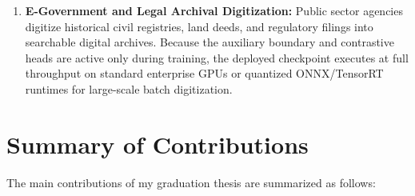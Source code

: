 \begin{enumerate}
    \item \textbf{E-Government and Legal Archival Digitization:}
    Public sector agencies digitize historical civil registries, land deeds, and regulatory filings into searchable digital archives. Because the auxiliary boundary and contrastive heads are active only during training, the deployed checkpoint executes at full throughput on standard enterprise GPUs or quantized ONNX/TensorRT runtimes for large-scale batch digitization.
\end{enumerate}

\section{Summary of Contributions}
\label{sec:contributions}

The main contributions of my graduation thesis are summarized as follows:
